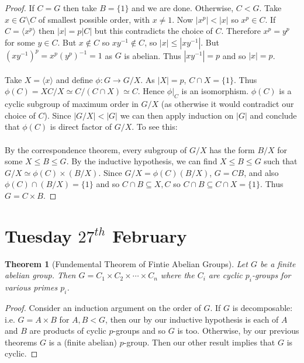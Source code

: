 \documentclass[a4paper,10pt]{article}
\newtheorem{thm}{Theorem}
\begin{document}
\begin{proof}
If $C = G$ then take $B = \{1\}$ and we are done. Otherwise, $C < G$. Take $x \in G \setminus C$ of smallest possible order, with $x \neq 1$. Now $|x^p| < |x|$ so $x^p \in C$. If $C = \langle x^p \rangle $ then $|x| = p|C|$ but this contradicts the choice of $C$. Therefore $x^p = y^p$ for some $y \in C$. But $x \notin C$ so $xy^{-1} \notin C$, so $|x| \leq |xy^{-1}|$. But $(xy^{-1})^p = x^p (y^p)^{-1} = 1$ as $G$ is abelian. Thus $|xy^{-1}| = p$ and so $|x| = p$. \\
\\
Take $X = \langle x \rangle$ and define $\phi : G \rightarrow G / X$. As $|X| = p$, $C \cap X = \{1\}$. Thus $\phi(C) = XC / X \simeq C / (C \cap X) \simeq C$. Hence $\phi |_C$ is an isomorphism. $\phi(C)$ is a cyclic subgroup of maximum order in $G / X$ (as otherwise it would contradict our choice of $C$). Since $|G / X| < |G|$ we can then apply induction on $|G|$ and conclude that $\phi(C)$ is direct factor of $G / X$. To see this: \\
\\
By the correspondence theorem, every subgroup of $G / X$ has the form $B / X$ for some $X \leq B \leq G$. By the inductive hypothesis, we can find $X \leq B \leq G$ such that $G / X \simeq \phi(C) \times (B / X)$. Since $G / X = \phi(C) (B / X)$, $G  = CB$, and also $\phi(C) \cap (B/X) = \{1\}$ and so $C \cap B \subseteq X, C$ so $C \cap B \subseteq C \cap X = \{ 1 \}$. Thus $G = C \times B$.  
\end{proof}



\newpage
\section{Tuesday $27^{th}$ February}

\begin{thm}[Fundemental Theorem of Fintie Abelian Groups]
Let $G$ be a finite abelian group. Then $G = C_1 \times C_2 \times \cdots \times  C_n$ where the $C_i$ are cyclic $p_i$-groups for various primes $p_i$. 
\end{thm}

\begin{proof}
Consider an induction argument on the order of $G$. If $G$ is decomposable: i.e. $G = A \times B$ for $A,B < G$, then our by our inductive hypothesis is each of $A$ and $B$ are products of cyclic $p$-groups and so $G$ is too. Otherwise, by our previous theorems $G$ is a (finite abelian) $p$-group. Then our other result implies that $G$ is cyclic.
\end{proof}
\end{document}
